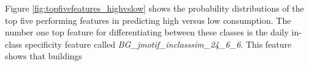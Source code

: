 Figure \ref{fig:topfivefeatures_highvslow} shows the probability distributions of the top five performing features in predicting high versus low consumption. The number one top feature for differentiating between these classes is the daily in-class specificity feature called \emph{BG_jmotif_inclasssim_24_6_6}. This feature shows that buildings 